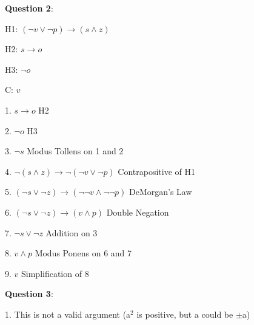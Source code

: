 \documentclass{article} %
\newcommand{\question}[2][]{\begin{flushleft}
        \textbf{Question #1}: \textit{#2}

\end{flushleft}}
\begin{document}
                                                                   

    \question[2]{}

    H1: $(\neg v \lor \neg p) \rightarrow (s \land z)$
    
    H2: $s \rightarrow o$
    
    H3: $\neg o$
    
    C: $v$

    \hspace*{0cm}

    1. $s \rightarrow o$ \tabto*{5cm}H2

    2. $\neg o$ \tabto*{5cm}H3

    3. $\neg s$ \tabto*{5cm}Modus Tollens on 1 and 2

    4. $\neg (s \land z) \rightarrow \neg (\neg v \lor \neg p)$ \tabto*{5cm}Contrapositive of H1

    5. $(\neg s \lor \neg z) \rightarrow (\neg \neg v \land \neg \neg p)$ \tabto*{5cm}DeMorgan's Law

    6. $(\neg s \lor \neg z) \rightarrow (v \land p)$ \tabto*{5cm}Double Negation

    7. $\neg s \lor \neg z$ \tabto*{5cm}Addition on 3

    8. $v \land p$ \tabto*{5cm}Modus Ponens on 6 and 7

    9. $v$ \tabto*{5cm}Simplification of 8
    

    \newpage


    \question[3]{}

    1. This is not a valid argument (a$^2$ is positive, but a could be $\pm$a)
    
\end{document}
